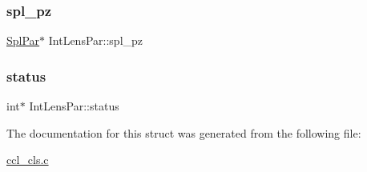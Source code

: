 \mbox{\label{struct_int_lens_par_af03176bfdcc66117c6317bf3a21d4eb2}} 
\subsubsection{\texorpdfstring{spl\+\_\+pz}{spl\_pz}}
{\footnotesize\ttfamily \mbox{\hyperlink{struct_spl_par}{Spl\+Par}}$\ast$ Int\+Lens\+Par\+::spl\+\_\+pz}

\mbox{\label{struct_int_lens_par_a618ab6203724fe7e8a5dc83bd8955b37}} 
\subsubsection{\texorpdfstring{status}{status}}
{\footnotesize\ttfamily int$\ast$ Int\+Lens\+Par\+::status}



The documentation for this struct was generated from the following file\+:\begin{DoxyCompactItemize}
\item 
\mbox{\hyperlink{ccl__cls_8c}{ccl\+\_\+cls.\+c}}\end{DoxyCompactItemize}

